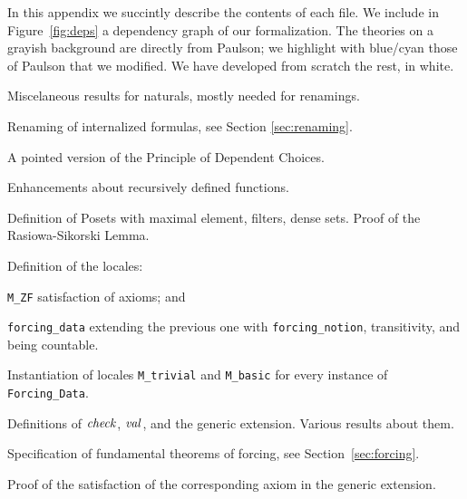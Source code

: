 In this appendix we succintly describe the contents of each file. We
include in 
Figure~\ref{fig:deps}  a dependency graph of our formalization. The
theories on a grayish background are directly from Paulson; we
highlight with blue/cyan those of Paulson that we modified. We
have developed from scratch the rest, in white.

\begin{description}[itemsep=1.5pt]
\item[\texttt{Nat\_Miscelanea}]Miscelaneous results for naturals, mostly
  needed for renamings.
\item[\texttt{Renaming}] Renaming of internalized formulas, see
  Section \ref{sec:renaming}.
\item[\texttt{Pointed\_DC}] A pointed version of the Principle of
  Dependent Choices.
\item[\texttt{Recursion\_Thms}] Enhancements about recursively defined
  functions.
\item[\texttt{Forcing\_Notions}] Definition of Posets with maximal
  element, filters, dense sets. Proof of the Rasiowa-Sikorski Lemma.
\item[\texttt{Forcing\_Data}] Definition of the locales:
  \begin{inlinelist}
  \item \texttt{M\_ZF} satisfaction of axioms; and 
  \item \texttt{forcing\_data} extending the previous one with
    \texttt{forcing\_notion}, transitivity, and being countable.
  \end{inlinelist}
\item[\texttt{Interface}] Instantiation of locales \texttt{M\_trivial}
  and \texttt{M\_basic} for every instance of \texttt{Forcing\_Data}.
\item[\texttt{Names}] Definitions of $\operatorname{\mathit{check}}$, $\operatorname{\mathit{val}}$, and the generic
  extension. Various results about them.
\item[\texttt{Forcing\_Theorems}] Specification of fundamental
  theorems of forcing, see Section~\ref{sec:forcing}.
\item[\texttt{*\_Axiom}] Proof of the satisfaction of the
  corresponding axiom in the generic extension.
\end{description}
%
